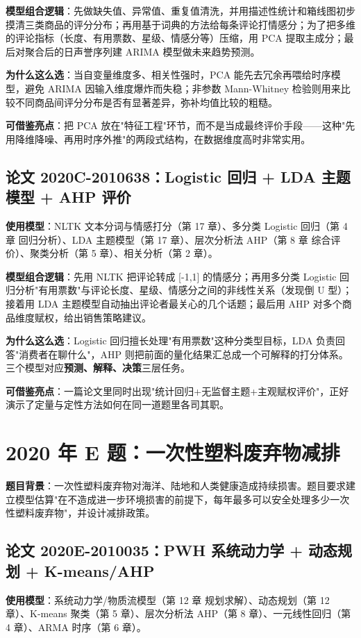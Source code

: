 \textbf{模型组合逻辑}：先做缺失值、异常值、重复值清洗，并用描述性统计和箱线图初步摸清三类商品的评分分布；再用基于词典的方法给每条评论打情感分；为了把多维的评论指标（长度、有用票数、星级、情感分等）压缩，用 PCA 提取主成分；最后对聚合后的日声誉序列建 ARIMA 模型做未来趋势预测。

\textbf{为什么这么选}：当自变量维度多、相关性强时，PCA 能先去冗余再喂给时序模型，避免 ARIMA 因输入维度爆炸而失稳；非参数 Mann-Whitney 检验则用来比较不同商品间评分分布是否有显著差异，弥补均值比较的粗糙。

\textbf{可借鉴亮点}：把 PCA 放在"特征工程"环节，而不是当成最终评价手段——这种"先用降维降噪、再用时序外推"的两段式结构，在数据维度高时非常实用。

\subsection{论文 2020C-2010638：Logistic 回归 + LDA 主题模型 + AHP 评价}
\textbf{使用模型}：NLTK 文本分词与情感打分（第 17 章）、多分类 Logistic 回归（第 4 章 回归分析）、LDA 主题模型（第 17 章）、层次分析法 AHP（第 8 章 综合评价）、聚类分析（第 5 章）、相关分析（第 2 章）。

\textbf{模型组合逻辑}：先用 NLTK 把评论转成 [-1,1] 的情感分；再用多分类 Logistic 回归分析"有用票数"与评论长度、星级、情感分之间的非线性关系（发现倒 U 型）；接着用 LDA 主题模型自动抽出评论者最关心的几个话题；最后用 AHP 对多个商品维度赋权，给出销售策略建议。

\textbf{为什么这么选}：Logistic 回归擅长处理"有用票数"这种分类型目标，LDA 负责回答"消费者在聊什么"，AHP 则把前面的量化结果汇总成一个可解释的打分体系。三个模型对应\textbf{预测、解释、决策}三层任务。

\textbf{可借鉴亮点}：一篇论文里同时出现"统计回归+无监督主题+主观赋权评价"，正好演示了定量与定性方法如何在同一道题里各司其职。

\section{2020 年 E 题：一次性塑料废弃物减排}

\textbf{题目背景}：一次性塑料废弃物对海洋、陆地和人类健康造成持续损害。题目要求建立模型估算"在不造成进一步环境损害的前提下，每年最多可以安全处理多少一次性塑料废弃物"，并设计减排政策。

\subsection{论文 2020E-2010035：PWH 系统动力学 + 动态规划 + K-means/AHP}
\textbf{使用模型}：系统动力学/物质流模型（第 12 章 规划求解）、动态规划（第 12 章）、K-means 聚类（第 5 章）、层次分析法 AHP（第 8 章）、一元线性回归（第 4 章）、ARMA 时序（第 6 章）。

